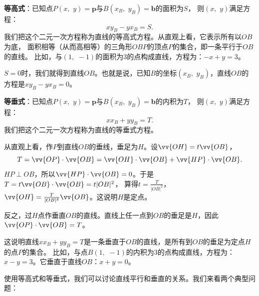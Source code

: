 \documentclass[12pt,UTF8,fontset=none]{ctexbook}
\begin{document}
\textbf{等高式}：已知点$P(x,\,\, y) = \mathbf{p}$与$B(x_B,\,\, y_B) = \mathbf{b}$的面积为$S$，
则$(x,\,\,y)$满足方程：
$$x y_B - y x_B = S.$$
我们把这个二元一次方程称为直线的等高式方程。从直观上看，它表示所有以$OB$为底，
面积相等（从而高相等）的三角形$OBP$的顶点$P$的集合，即一条平行于$OB$的直线。
比如，与$(1,\,\,-1)$的面积为$3$的点构成直线，方程为：$-x + y = 3$。

$S=0$时，我们就得到直线$OB$。也就是说，已知$B$的坐标$(x_B,\,\, y_B)$，直线$OB$的方程是$x y_B - y x_B = 0$。

\textbf{等垂式}：已知点$P(x, \,\,y) = \mathbf{p}$与$B(x_B, \,\,y_B) = \mathbf{b}$的内积为$T$，
则$(x,\,\,y)$满足方程：
$$x x_B + y y_B = T.$$
我们把这个二元一次方程称为直线的等垂式方程。

从直观上看，作$P$到直线$OB$的垂线，垂足为$H$。设$\vv{OH} = t \vv{OB}$，
$$ T = \vv{OP} \cdot \vv{OB} = \vv{OH} \cdot \vv{OB} + \vv{HP} \cdot \vv{OB}.$$
$ HP \perp OB$，所以$\vv{HP} \cdot \vv{OB} = 0$。于是$T = t \vv{OB} \cdot \vv{OB} = t|OB|^2$，
算得$t = \frac{T}{|OB|^2}$，$\vv{OH} = \frac{T}{|OB|^2} \vv{OB}$。这说明$H$是定点。

反之，过$H$点作垂直$OB$的直线。直线上任一点到$OB$的垂足是$H$，因此$\vv{OP} \cdot \vv{OB} = T$。

这说明直线$x x_B + y y_B = T$是一条垂直于$OB$的直线，是所有到$OB$的垂足为定点$H$的点$P$的集合。
比如，与点$B(1,\,\,-1)$的内积为$3$的点构成直线，方程为：$x - y = 3$。它垂直于直线$OB$：$x + y = 0$。

使用等高式和等垂式，我们可以讨论直线平行和垂直的关系。我们来看两个典型问题：
\end{document}
